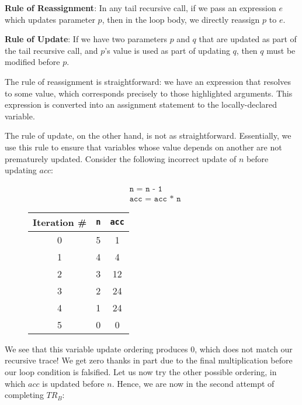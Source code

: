 \textbf{Rule of Reassignment}: In any tail recursive call, if we pass an expression $e$ which updates parameter $p$, then in the loop body, we directly reassign $p$ to $e$.

\textbf{Rule of Update}: If we have two parameters $p$ and $q$ that are updated as part of the tail recursive call, and $p$'s value is used as part of updating $q$, then $q$ must be modified before $p$.

The rule of reassignment is straightforward: we have an expression that resolves to some value, which corresponds precisely to those highlighted arguments. This expression is converted into an assignment statement to the locally-declared variable. 

The rule of update, on the other hand, is not as straightforward. Essentially, we use this rule to ensure that variables whose value depends on another are not prematurely updated. Consider the following incorrect update of $n$ before updating $\textit{acc}$:
\begin{figure}[H]
\centering
\begin{minipage}{.4\textwidth}
  \begin{align*}
  &\texttt{n = n - 1}\\
  &\texttt{acc = acc * n}
  \end{align*}
\end{minipage}%
\begin{minipage}{.4\textwidth}
\begin{tabular}{c|c|c}
Iteration \# & \texttt{n} & \texttt{acc}\\
\hline
\hline
0 & 5 & 1\\
\hline
1 & 4 & 4\\
\hline
2 & 3 & 12\\
\hline
3 & 2 & 24\\
\hline
4 & 1 & 24\\
\hline
5 & 0 & 0\\
\end{tabular}
\end{minipage}
\end{figure}
We see that this variable update ordering produces $0$, which does not match our recursive trace! We get zero thanks in part due to the final multiplication before our loop condition is falsified. Let us now try the other possible ordering, in which $\textit{acc}$ is updated before $n$. Hence, we are now in the second attempt of completing $TR_\textit{B}$:
